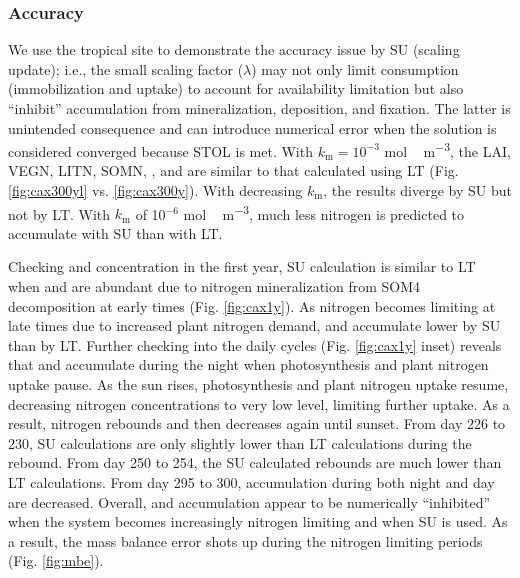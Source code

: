 \documentclass[gmd, manuscript]{copernicus}
\begin{document}
\subsubsection{Accuracy}
We use the tropical site to demonstrate the accuracy issue by SU (scaling
update); i.e., the small scaling factor ($\lambda$) may not only limit 
consumption (immobilization and uptake) to account for availability limitation
but also ``inhibit'' accumulation from mineralization, deposition, and fixation.
The latter is unintended consequence and can introduce numerical error when the
solution is considered converged because STOL is met. With $k_\text{m} =
10^{-3}$ \unit{mol\,m^{-3}}, the LAI, VEGN, LITN, SOMN, , and
 are similar to that calculated using LT (Fig.
\ref{fig:cax300yl} vs. \ref{fig:cax300y}). With decreasing $k_\text{m}$, the
results diverge by SU but not by LT. With $k_\text{m}$ of 10$^{-6}$
\unit{mol\,m^{-3}}, much less nitrogen is predicted to accumulate with SU than
with LT. 
  
Checking  and  concentration in the first year, SU
calculation is similar to LT when  and  are abundant
due to nitrogen mineralization from SOM4 decomposition at early times (Fig.
\ref{fig:cax1y}). As nitrogen becomes limiting at late times due to increased
plant nitrogen demand,  and  accumulate lower by SU
than by LT. Further checking into the daily cycles (Fig. \ref{fig:cax1y}
inset) reveals that  and  accumulate during the night when
photosynthesis and plant nitrogen uptake pause. As the sun rises,
photosynthesis and plant nitrogen uptake resume, decreasing nitrogen
concentrations to very low level, limiting further uptake. As a result,
nitrogen rebounds and then decreases again until sunset. From day 226 to 230,
SU calculations are only slightly lower than LT calculations during the
rebound. From day 250 to 254, the SU calculated rebounds are much lower than LT
calculations. From day 295 to 300, accumulation during both night and day are
decreased. Overall,  and  accumulation appear to be
numerically ``inhibited'' when the system becomes increasingly nitrogen limiting
and when SU is used. As a result, the mass balance error shots up during the
nitrogen limiting periods (Fig. \ref{fig:mbe}). 
\end{document}
